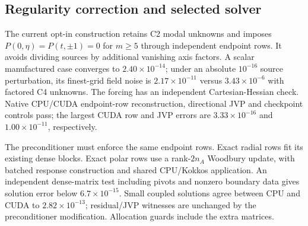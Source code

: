 \documentclass[aps,prd,preprint,notitlepage,nofootinbib]{revtex4-2}
\begin{document}
\subsection{Regularity correction and selected solver}
The current opt-in construction retains C2 modal unknowns and imposes
$P(0,\eta)=P(t,\pm1)=0$ for $m\geq5$ through independent endpoint rows.
It avoids dividing sources by additional vanishing axis factors. A scalar
manufactured case converges to $2.40\times10^{-14}$; under an absolute
$10^{-16}$ source perturbation, its finest-grid field noise is
$2.17\times10^{-11}$ versus $3.43\times10^{-6}$ with factored C4 unknowns.
The forcing has an independent Cartesian-Hessian check. Native CPU/CUDA
endpoint-row reconstruction, directional JVP and checkpoint controls pass;
the largest CUDA row and JVP errors are $3.33\times10^{-16}$ and
$1.00\times10^{-11}$, respectively.

The preconditioner must enforce the same endpoint rows. Exact radial rows fit
its existing dense blocks. Exact polar rows use a rank-$2n_A$ Woodbury update,
with batched response construction and shared CPU/Kokkos application. An
independent dense-matrix test including pivots and nonzero boundary data gives
solution error below $6.7\times10^{-15}$. Small coupled solutions agree between
CPU and CUDA to $2.82\times10^{-13}$; residual/JVP witnesses are unchanged by
the preconditioner modification. Allocation guards include the extra matrices.
\end{document}
